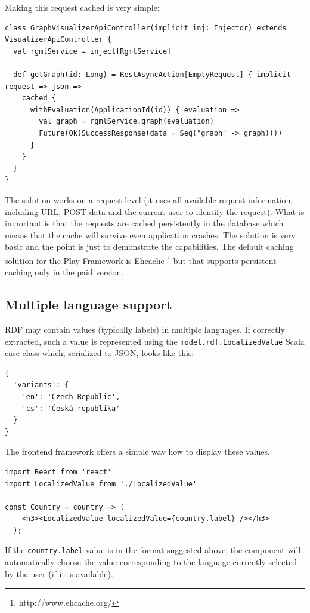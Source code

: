 Making this request cached is very simple:

\begin{verbatim}
class GraphVisualizerApiController(implicit inj: Injector) extends VisualizerApiController {
  val rgmlService = inject[RgmlService]

  def getGraph(id: Long) = RestAsyncAction[EmptyRequest] { implicit request => json =>
    cached {
      withEvaluation(ApplicationId(id)) { evaluation =>
        val graph = rgmlService.graph(evaluation)
        Future(Ok(SuccessResponse(data = Seq("graph" -> graph))))
      }
    }
  }
}
\end{verbatim}

The solution works on a request level (it uses all available request information, including URL, POST data and the current user to identify the request). What is important is that the requests are cached persistently in the database which means that the cache will survive even application crashes. The solution is very basic and the point is just to demonstrate the capabilities. The default caching solution for the Play Framework is Ehcache \footnote{http://www.ehcache.org/} but that supports persistent caching only in the paid version.

\subsection{Multiple language support}
\label{sec:implementation:advanced-features:multiple-language-support}


RDF may contain values (typically labels) in multiple languages. If correctly extracted, such a value is represented using the \texttt{model.rdf.LocalizedValue} Scala case class which, serialized to JSON, looks like this:

\begin{verbatim}
{
  'variants': {
    'en': 'Czech Republic',
    'cs': 'Česká republika'
  }
}
\end{verbatim}

The frontend framework offers a simple way how to display these values.

\begin{verbatim}
import React from 'react'
import LocalizedValue from './LocalizedValue'

const Country = country => (
    <h3><LocalizedValue localizedValue={country.label} /></h3>
  );
\end{verbatim}

If the \texttt{country.label} value is in the format suggested above, the component will automatically choose the value corresponding to the language currently selected by the user (if it is available).

